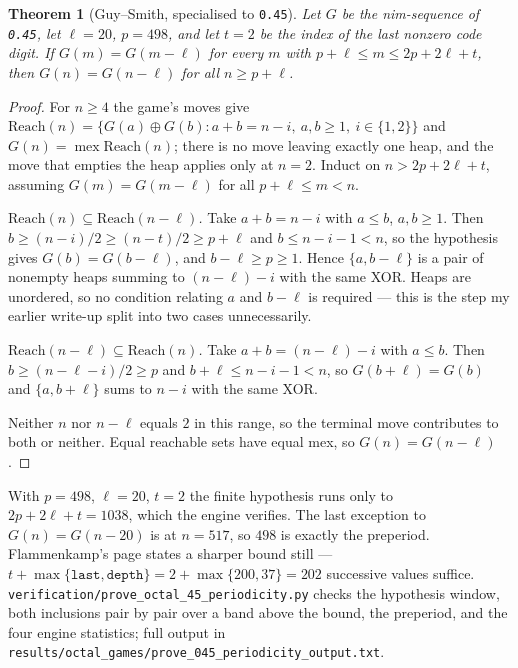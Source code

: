 \documentclass[12pt]{article}
\newtheorem{theorem}{Theorem}
\begin{document}
\begin{theorem}[Guy--Smith, specialised to \texttt{0.45}]
Let $G$ be the nim-sequence of \texttt{0.45}, let $\ell=20$, $p=498$, and let
$t=2$ be the index of the last nonzero code digit. If $G(m)=G(m-\ell)$ for
every $m$ with $p+\ell\le m\le 2p+2\ell+t$, then $G(n)=G(n-\ell)$ for all
$n\ge p+\ell$.
\end{theorem}

\begin{proof}
For $n\ge4$ the game's moves give
$\mathrm{Reach}(n)=\{G(a)\oplus G(b): a+b=n-i,\ a,b\ge1,\ i\in\{1,2\}\}$ and
$G(n)=\operatorname{mex}\mathrm{Reach}(n)$; there is no move leaving exactly
one heap, and the move that empties the heap applies only at $n=2$.
Induct on $n>2p+2\ell+t$, assuming $G(m)=G(m-\ell)$ for all $p+\ell\le m<n$.

\emph{$\mathrm{Reach}(n)\subseteq\mathrm{Reach}(n-\ell)$.} Take $a+b=n-i$ with
$a\le b$, $a,b\ge1$. Then $b\ge(n-i)/2\ge(n-t)/2\ge p+\ell$ and
$b\le n-i-1<n$, so the hypothesis gives $G(b)=G(b-\ell)$, and $b-\ell\ge p\ge1$.
Hence $\{a,b-\ell\}$ is a pair of nonempty heaps summing to $(n-\ell)-i$ with
the same XOR. Heaps are unordered, so no condition relating $a$ and $b-\ell$
is required --- this is the step my earlier write-up split into two cases
unnecessarily.

\emph{$\mathrm{Reach}(n-\ell)\subseteq\mathrm{Reach}(n)$.} Take
$a+b=(n-\ell)-i$ with $a\le b$. Then $b\ge(n-\ell-i)/2\ge p$ and
$b+\ell\le n-i-1<n$, so $G(b+\ell)=G(b)$ and $\{a,b+\ell\}$ sums to $n-i$
with the same XOR.

Neither $n$ nor $n-\ell$ equals $2$ in this range, so the terminal move
contributes to both or neither. Equal reachable sets have equal mex, so
$G(n)=G(n-\ell)$.
\end{proof}

With $p=498$, $\ell=20$, $t=2$ the finite hypothesis runs only to
$2p+2\ell+t=1038$, which the engine verifies. The last exception to
$G(n)=G(n-20)$ is at $n=517$, so $498$ is exactly the preperiod.
Flammenkamp's page states a sharper bound still --- $t+\max\{\texttt{last},
\texttt{depth}\}=2+\max\{200,37\}=202$ successive values suffice.
\texttt{verification/prove\_octal\_45\_periodicity.py} checks the hypothesis
window, both inclusions pair by pair over a band above the bound, the
preperiod, and the four engine statistics; full output in
\texttt{results/octal\_games/prove\_045\_periodicity\_output.txt}.
\end{document}
